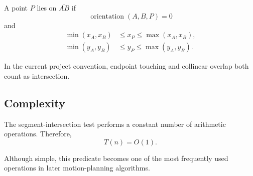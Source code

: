 A point $P$ lies on $\overline{AB}$ if
\[
\operatorname{orientation}(A,B,P)=0
\]
and
\begin{align*}
\min(x_A,x_B)&\leq x_P\leq\max(x_A,x_B),\\
\min(y_A,y_B)&\leq y_P\leq\max(y_A,y_B).
\end{align*}

In the current project convention, endpoint touching and collinear overlap
both count as intersection.

\subsection{Complexity}

The segment-intersection test performs a constant number of arithmetic
operations. Therefore,
\[
T(n)=O(1).
\]

Although simple, this predicate becomes one of the most frequently used
operations in later motion-planning algorithms.
